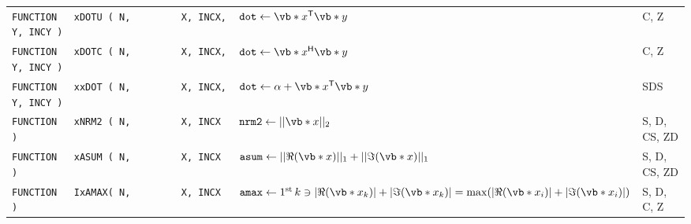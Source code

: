 \documentclass[10pt,a3paper, landscape]{article}
\newcommand{\T}{\mathsf{T}}
\renewcommand{\H}{\mathsf{H}}
\begin{document}
\begin{tabular}{lll}
		\verb|FUNCTION   xDOTU ( N,         X, INCX, Y, INCY )                                         |                                                                    & $\texttt{dot} \gets \vb*{x}^{\T} \vb*{y}$                                                                                                                                                                                                                    & C, Z               \\
		\verb|FUNCTION   xDOTC ( N,         X, INCX, Y, INCY )                                         |                                                                    & $\texttt{dot} \gets \vb*{x}^{\H} \vb*{y}$                                                                                                                                                                                                                    & C, Z               \\
		\verb|FUNCTION   xxDOT ( N,         X, INCX, Y, INCY )                                         |                                                                    & $\texttt{dot} \gets \alpha + \vb*{x}^{\T} \vb*{y}$                                                                                                                                                                                                           & SDS                \\
		\verb|FUNCTION   xNRM2 ( N,         X, INCX )                                                  |                                                                    & $\texttt{nrm2} \gets ||\vb*{x}||_2$                                                                                                                                                                                                                          & S, D, CS, ZD       \\
		\verb|FUNCTION   xASUM ( N,         X, INCX )                                                  |                                                                    & $\texttt{asum} \gets ||\Re(\vb*{x})||_1 + ||\Im(\vb*{x})||_1$                                                                                                                                                                                                & S, D, CS, ZD       \\
		\verb|FUNCTION   IxAMAX( N,         X, INCX )                                                  |                                                                    & $\texttt{amax} \gets \text{1\textsuperscript{st}\,} k \ni |\Re(\vb*{x}_k)| + |\Im(\vb*{x}_k)| = \max(|\Re(\vb*{x}_i)| + |\Im(\vb*{x}_i)|) $                                                                                                                  & S, D, C, Z         \\

\end{tabular}
\end{document}
